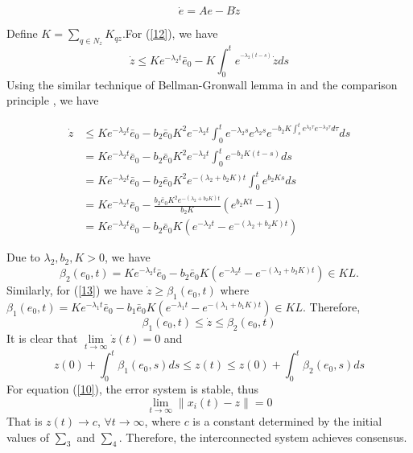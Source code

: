 \documentclass[english]{cccconf}
\begin{document}
{{\[\dot e = Ae - B\dot z \]


Define  $K = \sum\limits_{q \in {N_z}}^{} {{K_{qz}}} $.For (\ref{12}), we have
\begin{equation}  \label{14}
\dot z \le K{e^{ - {\lambda _2}t}}{\bar e_0} - K\int_0^t {{e^{^{ - {\lambda _2}(t - s)}}}} \dot zds
\end{equation}
Using the similar technique of  Bellman-Gronwall lemma in \cite{Ioannou2006} and the comparison principle \cite{Khalil2002}, we have

\begin{align}
\dot z &\le K{e^{ - {\lambda _2}t}}{{\bar e}_0} - {b_2}{{\bar e}_0}{K^2}{e^{ - {\lambda _2}t}}\int_0^t {{e^{ - {\lambda _2}s}}{e^{{\lambda _2}s}}{e^{ - {b_2}K\int_s^t {{e^{{\lambda _2}\tau }}{e^{ - {\lambda _2}\tau }}d\tau } }}ds} \nonumber\\
 &= K{e^{ - {\lambda _2}t}}{{\bar e}_0} - {b_2}{{\bar e}_0}{K^2}{e^{ - {\lambda _2}t}}\int_0^t {{e^{ - {b_2}K(t - s)}}ds} \nonumber\\
 &= K{e^{ - {\lambda _2}t}}{{\bar e}_0} - {b_2}{{\bar e}_0}{K^2}{e^{ - ({\lambda _2} + {b_2}K)t}}\int_0^t {{e^{{b_2}Ks}}ds} \nonumber\\
 &= K{e^{ - {\lambda _2}t}}{{\bar e}_0} - \frac{{{b_2}{{\bar e}_0}{K^2}{e^{ - ({\lambda _2} + {b_2}K)t}}}}{{{b_2}K}}({e^{{b_2}Kt}} - 1)\nonumber\\
 &= K{e^{ - {\lambda _2}t}}{{\bar e}_0} - {b_2}{{\bar e}_0}K({e^{ - {\lambda _2}t}} - {e^{ - ({\lambda _2} + {b_2}K)t}}) \nonumber
\end{align}

Due to ${\lambda _2},{b_2},K > 0$, we have
\[{\beta _2}({e_0},t) = K{e^{ - {\lambda _2}t}}{\bar e_0} - {b_2}{\bar e_0}K({e^{ - {\lambda _2}t}} - {e^{ - ({\lambda _2} + {b_2}K)t}}) \in KL.\]
Similarly, for (\ref{13})  we have  $\dot z \ge {\beta _1}({e_0},t)$
where ${\beta _1}({e_0},t) = K{e^{ - {\lambda _1}t}}{\bar e_0} - {b_1}{\bar e_0}K({e^{ - {\lambda _1}t}} - {e^{ - ({\lambda _1} + {b_1}K)t}}) \in KL.$
Therefore,
\[{\beta _1}({e_0},t) \le \dot z \le {\beta _2}({e_0},t)\]
It is clear that  $\mathop {\lim }\limits_{t \to \infty } \dot z(t) = 0$  and
\[z(0) + \int_0^t {{\beta _1}({e_0},s)ds}  \le z(t) \le z(0) + \int_0^t {{\beta _2}({e_0},s)ds} \]
For equation (\ref{10}), the error system is stable, thus
\[\mathop {\lim }\limits_{t \to \infty } \left\| {{x_i}(t) - z} \right\| = 0\]
That is $z(t) \to c$, $\forall t \to \infty$, where $c$ is a constant determined by the initial values of $\sum_3$ and $\sum_4$. Therefore, the interconnected system  achieves consensus.

}}
\end{document}
